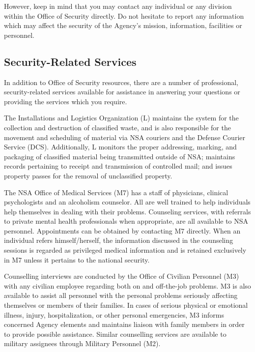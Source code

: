 \documentclass[a4]{article}
\begin{document}
However, keep in mind that you may contact any individual or any division
within the Office of Security directly.  Do not hesitate to report any
information which may affect the security of the Agency's mission, information,
facilities or personnel.

\subsection{Security-Related Services}

In addition to Office of Security resources, there are a number of
professional, security-related services available for assistance in answering
your questions or providing the services which you require.

The Installations and Logistics Organization (L) maintains the system for the
collection and destruction of classified waste, and is also responsible for the
movement and scheduling of material via NSA couriers and the Defense Courier
Service (DCS).  Additionally, L monitors the proper addressing, marking, and
packaging of classified material being transmitted outside of NSA; maintains
records pertaining to receipt and transmission of controlled mail; and issues
property passes for the removal of unclassified property.

The NSA Office of Medical Services (M7) has a staff of physicians, clinical
psychologists and an alcoholism counselor.  All are well trained to help
individuals help themselves in dealing with their problems.  Counseling
services, with referrals to private mental health professionals when
appropriate, are all available to NSA personnel.  Appointments can be obtained
by contacting M7 directly.  When an individual refers himself/herself, the
information discussed in the counseling sessions is regarded as privileged
medical information and is retained exclusively in M7 unless it pertains to the
national security.

Counselling interviews are conducted by the Office of Civilian Personnel (M3)
with any civilian employee regarding both on and off-the-job problems.  M3 is
also available to assist all personnel with the personal problems seriously
affecting themselves or members of their families.  In cases of serious
physical or emotional illness, injury, hospitalization, or other personal
emergencies, M3 informs concerned Agency elements and maintains liaison with
family members in order to provide possible assistance.  Similar counselling
services are available to military assignees through Military Personnel (M2).
\end{document}
